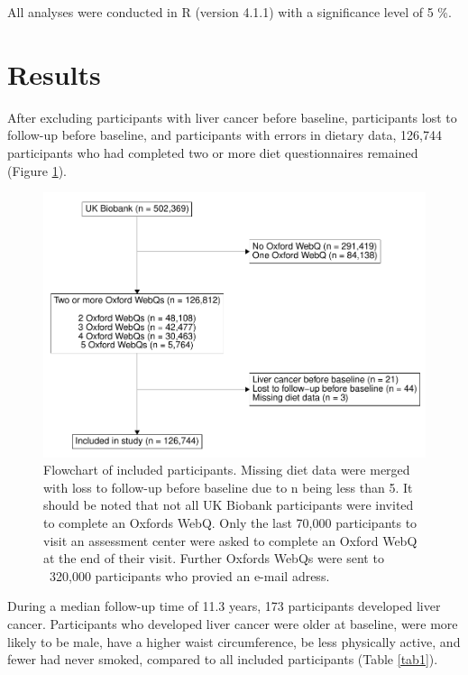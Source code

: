 \documentclass[sn-basic,Numbered,iicol,pdflatex]{sn-jnl}
\begin{document}
All analyses were conducted in R (version 4.1.1) with a significance
level of 5 \%.

\hypertarget{sec3}{%
\section{Results}\label{sec3}}

After excluding participants with liver cancer before baseline,
participants lost to follow-up before baseline, and participants with
errors in dietary data, 126,744 participants who had completed two or
more diet questionnaires remained (Figure \ref{fig:fig1}).

\begin{figure}
\includegraphics[width=1\linewidth,]{legliv_eur-j-nutr_files/figure-latex/fig1-1} \caption{Flowchart of included participants. Missing diet data were merged with loss to follow-up before baseline due to n being less than 5. It should be noted that not all UK Biobank participants were invited to complete an Oxfords WebQ. Only the last 70,000 participants to visit an assessment center were asked to complete an Oxford WebQ at the end of their visit. Further Oxfords WebQs were sent to ~320,000 participants who provied an e-mail adress.}\label{fig:fig1}
\end{figure}

During a median follow-up time of 11.3 years, 173 participants developed
liver cancer. Participants who developed liver cancer were older at
baseline, were more likely to be male, have a higher waist
circumference, be less physically active, and fewer had never smoked,
compared to all included participants (Table \ref{tab1}).
\end{document}
